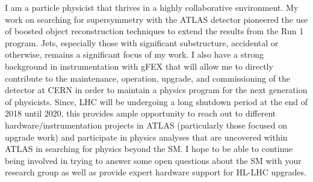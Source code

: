 I am a particle physicist that thrives in a highly collaborative environment. My work on searching for supersymmetry with the ATLAS detector pioneered the use of boosted object reconstruction techniques to extend the results from the Run 1 program. Jets, especially those with significant substructure, accidental or otherwise, remains a significant focus of my work. I also have a strong background in instrumentation with gFEX that will allow me to directly contribute to the maintenance, operation, upgrade, and commissioning of the detector at CERN in order to maintain a physics program for the next generation of physicists. Since, LHC will be undergoing a long shutdown period at the end of 2018 until 2020, this provides ample opportunity to reach out to different hardware/instrumentation projects in ATLAS (particularly those focused on upgrade work) and participate in physics analyses that are uncovered within ATLAS in searching for physics beyond the SM. I hope to be able to continue being involved in trying to answer some open questions about the SM with your research group as well as provide expert hardware support for HL-LHC upgrades.

\vspace{0.5cm}

\begin{footnotesize}


\end{footnotesize}


